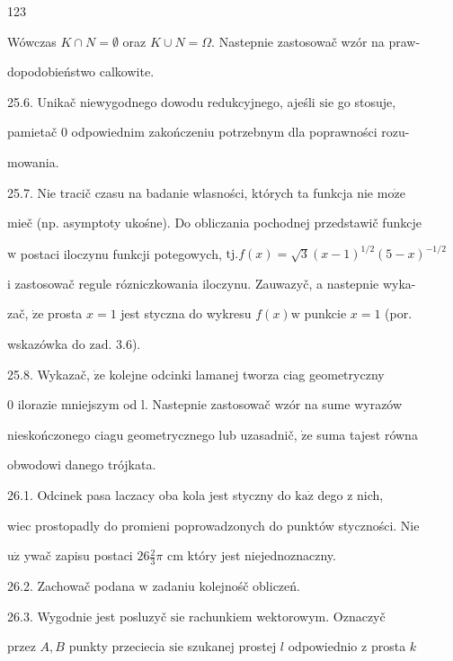 \documentclass[a4paper,12pt]{article}
\begin{document}
123

Wówczas $ K\cap N=\emptyset$ oraz $ K\cup N=\Omega$. Nastepnie zastosowač wzór na praw-

dopodobieństwo calkowite.

25.6. Unikač niewygodnego dowodu redukcyjnego, ajeśli $\mathrm{s}\mathrm{i}\mathrm{e}$ go stosuje,

pamietač $0$ odpowiednim zakończeniu potrzebnym dla poprawności rozu-

mowania.

25.7. Nie tracič czasu na badanie wlasności, których ta funkcja nie $\mathrm{m}\mathrm{o}\dot{\mathrm{z}}\mathrm{e}$

mieč (np. asymptoty ukośne). Do obliczania pochodnej przedstawič funkcje

$\mathrm{w}$ postaci iloczynu funkcji potegowych, $\mathrm{t}\mathrm{j}. f(x)=\sqrt{3}(x-1)^{1/2}(5-x)^{-1/2}$

$\mathrm{i}$ zastosowač regule rózniczkowania iloczynu. Zauwazyč, a nastepnie wyka-

zač, $\dot{\mathrm{z}}\mathrm{e}$ prosta $x= 1$ jest styczna do wykresu $f(x) \mathrm{w}$ punkcie $x= 1$ (por.

wskazówka do $\mathrm{z}\mathrm{a}\mathrm{d}$. 3.6).

25.8. Wykazač, $\dot{\mathrm{z}}\mathrm{e}$ kolejne odcinki lamanej tworza ciag geometryczny

$0$ ilorazie mniejszym od l. Nastepnie zastosowač wzór na sume wyrazów

nieskończonego ciagu geometrycznego lub uzasadnič, $\dot{\mathrm{z}}\mathrm{e}$ suma tajest równa

obwodowi danego trójkata.

26.1. Odcinek pasa laczacy oba kola jest styczny do $\mathrm{k}\mathrm{a}\dot{\mathrm{z}}$ dego $\mathrm{z}$ nich,

wiec prostopadly do promieni poprowadzonych do punktów styczności. Nie

$\mathrm{u}\dot{\mathrm{z}}$ ywač zapisu postaci $ 26\displaystyle \frac{2}{3}\pi$ cm który jest niejednoznaczny.

26.2. Zachowač podana $\mathrm{w}$ zadaniu kolejnośč obliczeń.

26.3. Wygodnie jest posluzyč $\mathrm{s}\mathrm{i}\mathrm{e}$ rachunkiem wektorowym. Oznaczyč

przez $A, B$ punkty przeciecia $\mathrm{s}\mathrm{i}\mathrm{e}$ szukanej prostej $l$ odpowiednio $\mathrm{z}$ prosta $k$
\end{document}
